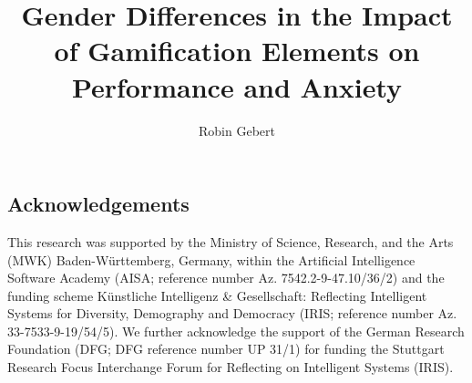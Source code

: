 \documentclass[stu, floatsintext, helv]{apa7}
\title{Gender Differences in the Impact of Gamification Elements on Performance and Anxiety}
\author{Robin Gebert}
\begin{document}
\maketitle


%






\subsection*{Acknowledgements}
This research was supported by the Ministry of Science, Research, and the Arts (MWK) Baden-Württemberg,
Germany, within the Artificial Intelligence Software Academy (AISA; reference number Az. 7542.2-9-47.10/36/2)
and the funding scheme Künstliche Intelligenz \& Gesellschaft: Reflecting Intelligent Systems for Diversity,
Demography and Democracy (IRIS; reference number Az. 33-7533-9-19/54/5). We further acknowledge the
support of the German Research Foundation (DFG; DFG reference number UP 31/1) for funding the Stuttgart
Research Focus Interchange Forum for Reflecting on Intelligent Systems (IRIS).

\printbibliography
\end{document}

